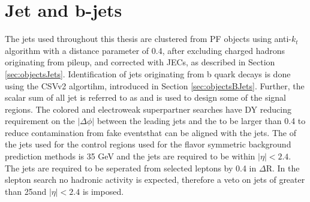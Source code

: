\section{Jet and b-jets}\label{sec:jetSelections}
\noindent
\justify
The jets used throughout this thesis are clustered from PF objects using anti-$k_{t}$ algorithm with a distance parameter of 0.4, after excluding charged hadrons originating from pileup, and corrected with JECs, as described in Section \ref{sec:objectsJets}. 
Identification of jets originating from b quark decays is done using the CSVv2 algortihm, introduced in Section \ref{sec:objectsBJets}.
Further, the scalar sum of all jet \pt is referred to as \HT and is used to design some of the signal regions.
The colored and electroweak superpartner searches have DY reducing requirement on the $|\Delta\phi|$ between the leading jets and the \ptmiss to be larger than 0.4 to reduce contamination from fake \ptmiss eventsthat can be aligned with the jets.   
The \pt of the jets used for the control regions used for the flavor symmetric background prediction methods is 35 GeV and the jets are required to be within $|\eta|<2.4$. 
The jets are required to be seperated from selected leptons by 0.4 in $\Delta$R. 
In the slepton search no hadronic activity is expected, therefore a veto on jets of \pt greater than 25\GeV and $|\eta|<2.4$ is imposed.
